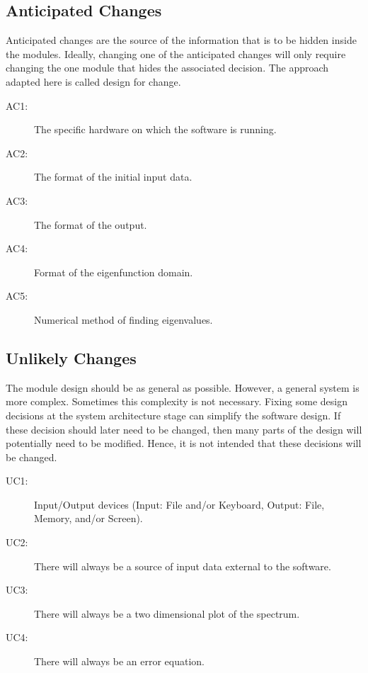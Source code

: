 \documentclass[12pt, titlepage]{article}
\begin{document}
\subsection{Anticipated Changes} \label{SecAchange}

Anticipated changes are the source of the information that is to be hidden
inside the modules. Ideally, changing one of the anticipated changes will only
require changing the one module that hides the associated decision. The approach
adapted here is called design for
change.

\begin{description}
\item[AC1:] The specific hardware on which the software is running.\\
\item[AC2:] The format of the initial input data.\\
\item[AC3:] The format of the output.\\
\item[AC4:] Format of the eigenfunction domain. \\
\item[AC5:] Numerical method of finding eigenvalues. \\
\end{description}

\subsection{Unlikely Changes} \label{SecUchange}

The module design should be as general as possible. However, a general system is
more complex. Sometimes this complexity is not necessary. Fixing some design
decisions at the system architecture stage can simplify the software design. If
these decision should later need to be changed, then many parts of the design
will potentially need to be modified. Hence, it is not intended that these
decisions will be changed.

\begin{description}
\item[UC1:] Input/Output devices
  (Input: File and/or Keyboard, Output: File, Memory, and/or Screen).\\
\item[UC2:] There will always be
  a source of input data external to the software.\\
\item[UC3:] There will always be a two dimensional plot of the spectrum. \\
\item[UC4:] There will always be an error equation. \\
\end{description}
\end{document}
